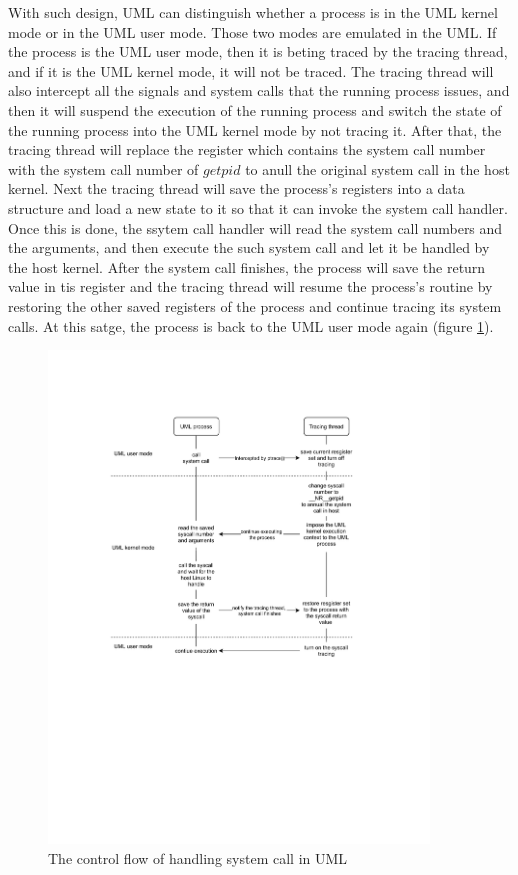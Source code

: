 With such design, UML can distinguish whether a process is in the UML kernel mode or in the UML user mode. Those two modes are emulated in the UML. If the process is the UML user mode, then it is beting traced by the tracing thread, and if it is the UML kernel mode, it will not be traced. The tracing thread will also intercept all the signals and system calls that the running process issues, and then it will suspend the execution of the running process and switch the state of the running process into the UML kernel mode by not tracing it. After that, the tracing thread will replace the register which contains the system call number with the system call number of $getpid$ to anull the original system call in the host kernel. Next the tracing thread will save the process's registers into a data structure and load a new state to it so that it can invoke the system call handler. Once this is done, the ssytem call handler will read the system call numbers and the arguments, and then execute the such system call and let it be handled by the host kernel. After the system call finishes, the process will save the return value in tis register and the tracing thread will resume the process's routine by restoring the other saved registers of the process and continue tracing its system calls. At this satge, the process is back to the UML user mode again (figure \ref{fig:uml-sys}).

\begin{figure}[h]
    \centering
    \includegraphics[clip, trim=0.5cm 16cm 3cm 0.5cm, width=0.9\textwidth, height=0.8\textwidth]{ch2/UML-syscall.pdf}
    \caption{The control flow of handling system call in UML}
    \label{fig:uml-sys}
\end{figure}

